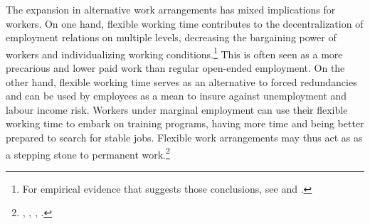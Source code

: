 \documentclass[12pt, a4paper]{article}
\begin{document}
The expansion in alternative work arrangements has mixed implications for workers. On one hand, flexible working time contributes to the decentralization of employment relations on multiple levels, decreasing the bargaining power of workers and individualizing working conditions.\footnote{For empirical evidence that suggests those conclusions, see \cite{AddisonCotti15} and \cite{DuSpOe14}.} This is often seen as a more precarious and lower paid work than regular open-ended employment. On the other hand, flexible working time serves as an alternative to forced redundancies and can be used by employees as a mean to insure against unemployment and labour income risk. Workers under marginal employment can use their flexible working time to embark on training programs, having more time and being better prepared to search for stable jobs. Flexible work arrangements may thus act as as a stepping stone to permanent work.\footnote{\cite{Berg2008}, \cite{Seifert2006}, \cite{Caliendo2016}, \cite{Booth02}.}






\end{document}
